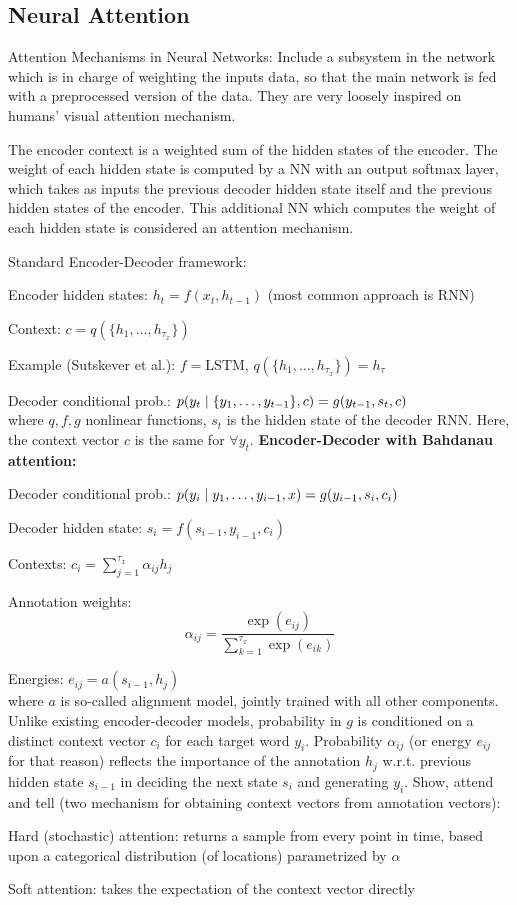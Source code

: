 \documentclass[12pt]{article}
\begin{document}
\subsection{Neural Attention}
\par Attention Mechanisms in Neural Networks: Include a subsystem in the network which is in charge of weighting the inputs data, so that the main network is fed with a preprocessed version of the data. They are very loosely inspired on humans' visual attention mechanism.
\par The encoder context is a weighted sum of the hidden states of the encoder. The weight of each hidden state is computed by a NN with an output softmax layer, which takes as inputs the previous decoder hidden state itself and the previous hidden states of the encoder. This additional NN which computes the weight of each hidden state is considered an attention mechanism.
\par Standard Encoder-Decoder framework:
\ulb
\item Encoder hidden states: $h_t = f(x_t, h_{t-1})$ (most common approach is RNN)
\item Context: $c = q(\{ h_1, \dots ,h_{\tau_x} \})$
\item Example (Sutskever et al.): $f = \text{LSTM}$, $q(\{ h_1, \dots ,h_{\tau_x} \}) = h_{\tau} $
\item Decoder conditional prob.: $p(y_t \mid \{y_1, \dots , y_{t-1}\}, c) = g(y_{t-1},s_t,c)$ \\
where $q,f,g$ nonlinear functions, $s_t$ is the hidden state of the decoder RNN. Here, the context vector $c$ is the same for $\forall y_t$.
\ule
\textbf{Encoder-Decoder with Bahdanau attention:}
\ulb
\item Decoder conditional prob.: $p(y_i\mid y_1,\dots,y_{i-1},x) = g(y_{i-1},s_i,c_i)$
\item Decoder hidden state: $s_i = f(s_{i-1},y_{i-1},c_i)$
\item Contexts: $c_i = \sum_{j=1}^{\tau_x} \alpha_{ij} h_j$
\item Annotation weights: $$\alpha_{ij} = \frac{\exp(e_{ij})}{\sum_{k=1}^{\tau_x} \exp(e_{ik})}$$
\item Energies: $e_{ij} = a(s_{i-1}, h_j)$  \\
where $a$ is so-called alignment model, jointly trained with all other components. Unlike existing encoder-decoder models, probability in $g$ is conditioned on a distinct context vector $c_i$ for each target word $y_i$. Probability $\alpha_{ij}$ (or energy $e_{ij}$ for that reason) reflects the importance of the annotation $h_{j}$ w.r.t. previous hidden state $s_{i-1}$ in deciding the next state $s_i$ and generating $y_i$.
\ule
Show, attend and tell (two mechanism for obtaining context vectors from annotation vectors):
\ulb
\item Hard (stochastic) attention: returns a sample from every point in time, based upon a categorical distribution (of locations) parametrized by $\alpha$
\item Soft attention: takes the expectation of the context vector directly
\item 
\ule
\end{document}
